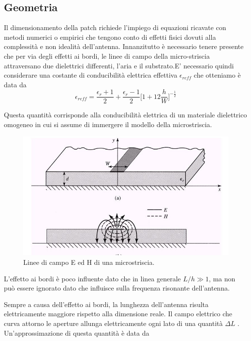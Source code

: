 \documentclass[twoside,twocolumn]{article}
\begin{document}
\subsection*{Geometria}
Il dimensionamento della patch richiede l'impiego di equazioni ricavate con metodi numerici o empirici che tengono conto di effetti fisici dovuti alla complessità e non idealità dell'antenna.
Innanzitutto è necessario tenere presente che per via degli effetti ai bordi, le linee di campo della micro-striscia attraversano due dielettrici differenti, l'aria e il substrato.E' necessario quindi considerare una costante di conducibilità elettrica effettiva $\epsilon_{{reff}}$ che otteniamo è data da 
\begin{equation}
\label{eq:emc}
\epsilon_{reff}= \frac{\epsilon_{r}+1}{2}+\frac{\epsilon_{r}-1}{2}\Big[1+12\frac{h}{W}\Big]^{-\frac{1}{2}}
\end{equation}

Questa quantità corrisponde alla conducibilità elettrica di un materiale dielettrico omogeneo in cui si assume di immergere il modello della microstriscia.

\begin{figure}
  \includegraphics[width=\linewidth]{MICROSTRIPlinefield.jpg}
  \caption{Linee di campo E ed H di una microstriscia.}
  \label{fig:linefield}
\end{figure}
L'effetto ai bordi è poco influente dato che in linea generale \(L/h\gg 1\), ma non può essere ignorato dato che influisce sulla frequenza risonante dell'antenna.


Sempre a causa dell'effetto ai bordi, la lunghezza dell'antenna risulta elettricamente maggiore rispetto alla dimensione reale.
Il campo elettrico che curva attorno le aperture allunga elettricamente ogni lato di una quantità $\Delta L$ .
Un'approssimazione di questa quantità è data da
\end{document}

